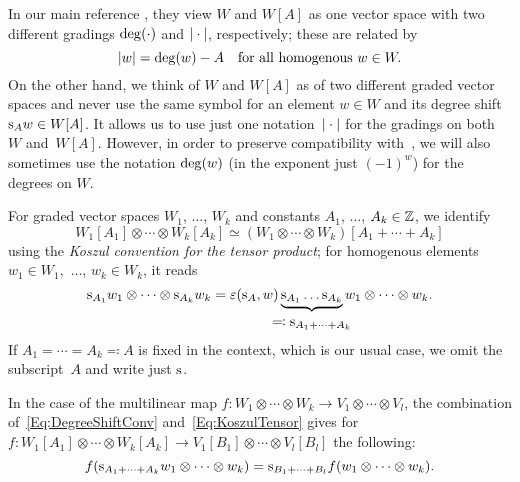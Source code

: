 \documentclass[\MainFolder/Text.tex]{subfiles}
\begin{document}
In our main reference \cite{Cieliebak2015}, they view $W$ and $W[A]$ as one vector space with two different gradings $\operatorname{deg}(\cdot)$ and $|\cdot|$, respectively; these are related by
\begin{equation*}
|w| = \operatorname{deg}(w) - A \quad\text{for all homogenous }w\in W. 
\end{equation*}
On the other hand, we think of $W$ and $W[A]$ as of two different graded vector spaces and never use the same symbol for an element $w\in W$ and its degree shift $\mathrm{s}_A w \in W[A]$. %
It allows us to use just one notation~$|\cdot|$ for the gradings on both~$W$ and~$W[A]$. However, in order to preserve compatibility with~\cite{Cieliebak2015}, we will also sometimes use the notation $\operatorname{deg}(w)$ (in the exponent just $(-1)^w$) for the degrees on $W$.

For graded vector spaces $W_1$, $\dotsc$, $W_k$ and constants $A_1$, $\dotsc$, $A_k\in \mathbb{Z}$, we identify 
$$ W_1[A_1]\otimes \dotsb \otimes W_k[A_k] \simeq (W_1\otimes \dotsb \otimes W_k)[A_1+\dotsb+A_k] $$ using the \emph{Koszul convention for the tensor product}; for homogenous elements $w_1 \in W_1$,~$\dotsc$, $w_k \in W_k$, it reads
\begin{equation} \label{Eq:KoszulTensor}
\Susp_{A_1} w_1 \otimes \dotsb \otimes \Susp_{A_k} w_k = \varepsilon(\Susp_A,w) \underbrace{\Susp_{A_1}\dots\Susp_{A_k}}_{\displaystyle \mathclap{\eqqcolon \Susp_{A_1 + \dotsb + A_k}}\rule{0ex}{2ex}} w_1 \otimes \dotsb \otimes w_k.
\end{equation}
If $A_1 = \dotsb = A_k \eqqcolon A$ is fixed in the context, which is our usual case, we omit the subscript~$A$ and write just $\mathrm{s}$.

In the case of the multilinear map $f: W_1\otimes \dotsb \otimes W_k \rightarrow V_1\otimes \dotsb \otimes V_l$, the combination of~\eqref{Eq:DegreeShiftConv} and~\eqref{Eq:KoszulTensor} gives for $f: W_1[A_1]\otimes \dotsb\otimes W_k[A_k] \rightarrow V_1[B_1]\otimes \dotsb\otimes V_l[B_l]$ the following:
\begin{equation}\label{Eq:DegreeShiftConvII}
 f(\mathrm{s}_{A_1 +\dotsb + A_k} w_1 \otimes \dotsb \otimes w_k) = \mathrm{s}_{B_1 + \dotsb + B_l} f(w_1 \otimes \dotsb \otimes w_k).
\end{equation}
\end{document}
